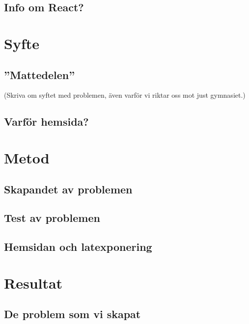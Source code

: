 \documentclass[11 pt,a4paper]{article}
\begin{document}
    \subsection{Info om React?}
        
\section{Syfte}
    \subsection{''Mattedelen''}
        
    (Skriva om syftet med problemen, även varför vi riktar oss mot just gymnasiet.)
    
    \subsection{Varför hemsida?}
        

\section{Metod}

    \subsection{Skapandet av problemen}
    \label{sec:Skapandetavproblem}
        
        
    \subsection{Test av problemen}
        

    \subsection{Hemsidan och latexponering}
        
       
\section{Resultat}

    \subsection{De problem som vi skapat}
    
\end{document}
